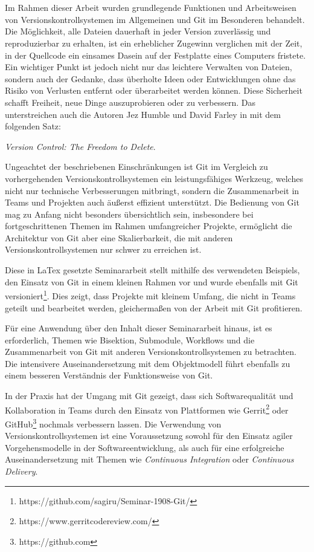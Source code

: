 \chapter{\result}\label{cha:result}
Im Rahmen dieser Arbeit wurden grundlegende Funktionen und Arbeitsweisen von
Versionskontrollsystemen im Allgemeinen und Git im Besonderen behandelt.
Die Möglichkeit, alle Dateien dauerhaft in jeder Version zuverlässig und
reproduzierbar zu erhalten, ist ein erheblicher Zugewinn verglichen mit der
Zeit, in der Quellcode ein einsames Dasein auf der Festplatte eines Computers
fristete. Ein wichtiger Punkt ist jedoch nicht nur das leichtere
Verwalten von Dateien, sondern auch der Gedanke, dass überholte Ideen oder
Entwicklungen ohne das Risiko von Verlusten entfernt oder überarbeitet werden
können. Diese Sicherheit schafft Freiheit, neue Dinge auszuprobieren
oder zu verbessern. Das unterstreichen auch die Autoren Jez Humble und David
Farley in \cite[S.~35]{cd} mit dem folgenden Satz:

\begin{center}
\textit{\glqq{}Version Control: The Freedom to Delete}\grqq{}.
\end{center}

Ungeachtet der beschriebenen Einschränkungen ist Git im Vergleich zu
vorhergehenden Versionskontrollsystemen ein leistungsfähiges Werkzeug, welches
nicht nur technische Verbesserungen mitbringt, sondern die Zusammenarbeit in
Teams und Projekten auch äußerst effizient unterstützt. Die Bedienung von
Git mag zu Anfang nicht besonders übersichtlich sein, insbesondere bei
fortgeschrittenen Themen im Rahmen umfangreicher Projekte, ermöglicht die
Architektur von Git aber eine Skalierbarkeit, die mit anderen
Versionskontrollsystemen nur schwer zu erreichen ist.

Diese in LaTex gesetzte Seminararbeit stellt mithilfe des verwendeten Beispiels,
den Einsatz von Git in einem kleinen Rahmen vor und wurde ebenfalls mit Git
versioniert\footnote{https://github.com/sagiru/Seminar-1908-Git/}. Dies zeigt,
dass Projekte mit kleinem Umfang, die nicht in Teams geteilt und bearbeitet
werden, gleichermaßen von der Arbeit mit Git profitieren.

Für eine Anwendung über den Inhalt dieser Seminararbeit hinaus, ist es
erforderlich, Themen wie Bisektion, Submodule, Workflows und die Zusammenarbeit
von Git mit anderen Versionskontrollsystemen zu betrachten. Die intensivere
Auseinandersetzung mit dem Objektmodell führt ebenfalls zu einem besseren
Verständnis der Funktionsweise von Git.

In der Praxis hat der Umgang mit Git gezeigt, dass sich Softwarequalität und
Kollaboration in Teams durch den Einsatz von Plattformen wie
Gerrit\footnote{https://www.gerritcodereview.com/} oder
GitHub\footnote{https://github.com} nochmals verbessern lassen. Die Verwendung
von Versionskontrollsystemen ist eine Voraussetzung sowohl für den Einsatz
agiler Vorgehensmodelle in der Softwareentwicklung, als auch für eine
erfolgreiche Auseinandersetzung mit Themen wie \textit{Continuous Integration}
oder \textit{Continuous Delivery}.
